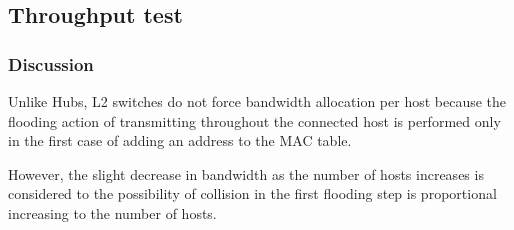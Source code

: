 \subsection{Throughput test}
\begin{figure}[h!]
\centering
\captionsetup[subfloat]{labelformat=empty}
\hfill
{}\hfill
{}
\end{figure}
\clearpage
\subsubsection*{Discussion}
Unlike Hubs, L2 switches do not force bandwidth allocation per host because the flooding action of transmitting throughout the connected host is performed only in the first case of adding an address to the MAC table.

However, the slight decrease in bandwidth as the number of hosts increases is considered to the possibility of collision in the first flooding step is proportional increasing to the number of hosts.
\clearpage